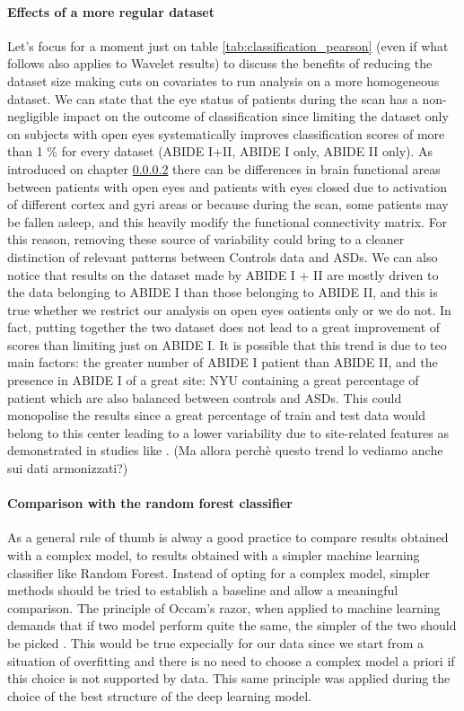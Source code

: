 \documentclass[11pt]{report}
\begin{document}
\paragraph{Effects of a more regular dataset}
Let's focus for a moment just on table \ref{tab:classification_pearson} (even if what follows also applies to Wavelet results) to discuss the benefits of reducing the dataset size making cuts on covariates to run analysis on a more homogeneous dataset.
We can state that the eye status of patients during the scan has a non-negligible impact on the outcome of classification since limiting the dataset only on subjects with open eyes systematically improves classification scores of more than 1 \% for every dataset (ABIDE I+II, ABIDE I only, ABIDE II only).
As introduced on chapter \ref{} there can be differences in brain functional areas between patients with open eyes and patients with eyes closed due to activation of different cortex and gyri areas or because during the scan, some patients may be fallen asleep, and this heavily modify the functional connectivity matrix.
For this reason, removing these source of variability could bring to a cleaner distinction of relevant patterns between Controls data and ASDs.
We can also notice that results on the dataset made by ABIDE I + II are mostly driven to the data belonging to ABIDE I than those belonging to ABIDE II, and this is true whether we restrict our analysis on open eyes oatients only or we do not.
In fact, putting together the two dataset does not lead to a great improvement of scores than limiting just on ABIDE I.
It is possible that this trend is due to teo main factors: the greater number of ABIDE I patient than ABIDE II, and the presence in ABIDE I of a great site: NYU containing a great percentage of patient which are also balanced between controls and ASDs.
This could monopolise the results since a great percentage of train and test data would belong to this center leading to a lower variability due to site-related features as demonstrated in studies like \cite{spera-2019}.
(Ma allora perchè questo trend lo vediamo anche sui dati armonizzati?)


\paragraph{Comparison with the random forest classifier}
As a general rule of thumb is alway a good practice to compare results obtained with a complex model, to results obtained with a simpler machine learning classifier like Random Forest. Instead of opting for a complex model, simpler methods should be tried to establish a baseline and allow a meaningful comparison. The principle of Occam's razor, when applied to machine learning demands that if two model perform quite the same, the simpler of the two should be picked \cite{domingos-1999}. This would be true expecially for our data since we start from a situation of overfitting and there is no need to choose a complex model a priori if this choice is not supported by data. This same principle was applied during the choice of the best structure of the deep learning model.
\end{document}
